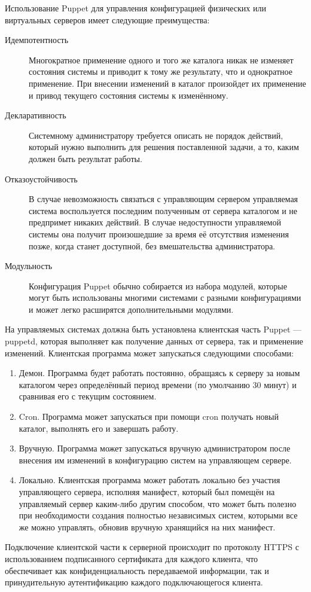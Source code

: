 Использование Puppet для управления конфигурацией физических или виртуальных серверов имеет следующие преимущества:

\begin{description}
\item[Идемпотентность] Многократное применение одного и того же каталога никак не изменяет состояния системы и приводит к тому же результату, что и однократное применение. При внесении изменений в каталог произойдет их применение и привод текущего состояния системы к изменённому.
\item[Декларативность] Системному администратору требуется описать не порядок действий, который нужно выполнить для решения поставленной задачи, а то, каким должен быть результат работы.
\item[Отказоустойчивость] В случае невозможность связаться с управляющим сервером управляемая система воспользуется последним полученным от сервера каталогом и не предпримет никаких действий. В случае недоступности управляемой системы она получит произошедшие за время её отсутствия изменения позже, когда станет доступной, без вмешательства администратора.
\item[Модульность] Конфигурация Puppet обычно собирается из набора модулей, которые могут быть использованы многими системами с разными конфигурациями и может легко расширятся дополнительными модулями.
\end{description}

На управляемых системах должна быть установлена клиентская часть Puppet — puppetd, которая выполняет как получение данных от сервера, так и применение изменений. Клиентская программа может запускаться следующими способами:

\begin{enumerate}
\item Демон. Программа будет работать постоянно, обращаясь к серверу за новым каталогом через определённый период времени (по умолчанию 30 минут) и сравнивая его с текущим состоянием.
\item Cron. Программа может запускаться при помощи cron получать новый каталог, выполнять его и завершать работу.
\item Вручную. Программа может запускаться вручную администратором после внесения им изменений в конфигурацию систем на управляющем сервере.
\item Локально. Клиентская программа может работать локально без участия управляющего сервера, исполняя манифест, который был помещён на управляемый сервер каким-либо другим способом, что может быть полезно при необходимости создания полностью независимых систем, которыми все же можно управлять, обновив вручную хранящийся на них манифест.
\end{enumerate}

Подключение клиентской части к серверной происходит по протоколу HTTPS с использованием подписанного сертификата для каждого клиента, что обеспечивает как конфиденциальность передаваемой информации, так и принудительную аутентификацию каждого подключающегося клиента.
